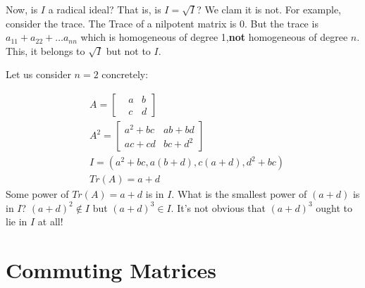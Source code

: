 \documentclass{book}
\theoremstyle{definition}
\begin{document}
Now, is $I$ a radical ideal? That is, is $I = \sqrt{I}$? We clam it is not.
For example, consider the trace. The Trace of a nilpotent matrix is 0.
But the trace is $a_{11} + a_{22} + \dots a_{nn}$ which is homogeneous
of degree 1,\textbf{not} homogeneous of degree $n$. This, it belongs to
$\sqrt{I}$ but not to $I$.

Let us consider $n = 2$ concretely:

\begin{align*}
&A = \begin{bmatrix} 
&     a & b \\
&     c & d \end{bmatrix} \\
&A^2 = \begin{bmatrix} a^2 + bc & ab + bd \\ ac + cd & bc + d^2 \end{bmatrix} \\
&I = (a^2 + bc, a(b+d), c(a+d), d^2 + bc) \\
&Tr(A) = a + d
\end{align*}
Some power of $Tr(A) = a + d$ is in $I$. What is the smallest power of $(a+d)$
is in $I$? $(a+d)^2 \not \in I$ but $(a+d)^3 \in I$. It's not obvious that
$(a+d)^3$ ought to lie in $I$ at all!



\section{Commuting Matrices}
\end{document}

